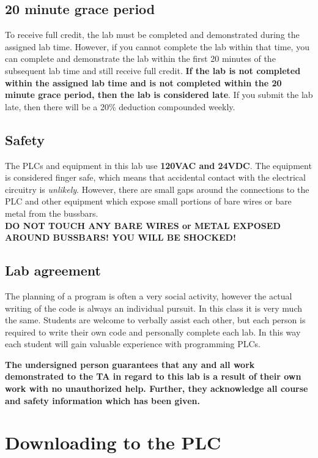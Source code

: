 \subsection{20 minute grace period}
To receive full credit, the lab must be completed and demonstrated during the assigned lab time. However, if you cannot complete the lab within that time, you can complete and demonstrate the lab within the first 20 minutes of the subsequent lab time and still receive full credit. \textbf{If the lab is not completed within the assigned lab time and is not completed within the 20 minute grace period, then the lab is considered late}. If you submit the lab late, then there will be a 20\% deduction compounded weekly.


\subsection{Safety}

The PLCs and equipment in this lab use \textbf{120VAC and 24VDC}. The equipment is considered finger safe, which means that accidental contact with the electrical circuitry is \textit{unlikely}. However, there are small gaps around the connections to the PLC and other equipment which expose small portions of bare wires or bare metal from the bussbars. 
\\
\textbf{DO NOT TOUCH ANY BARE WIRES or METAL EXPOSED AROUND BUSSBARS! YOU WILL BE SHOCKED!}
\\

\subsection{Lab agreement}

The planning of a program is often a very social activity, however the actual writing of the code is always an individual pursuit. In this class it is very much the same. Students are welcome to verbally assist each other, but each person is required to write their own code and personally complete each lab. In this way each student will gain valuable experience with programming PLCs. 

\textbf{The undersigned person guarantees that any and all work demonstrated to the TA in regard to this lab is a result of their own work with no unauthorized help. Further, they acknowledge all course and safety information which has been given.}



\section{Downloading to the PLC}


